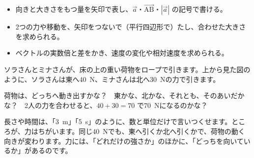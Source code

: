 
\begin{goal}
\begin{itemize}[label={\color{\bkTT}●}, leftmargin=1.6\zw, itemsep=0pt, topsep=1pt]
\item {}\enspace 向きと大きさをもつ量を矢印で表し、$\vec{a}$・$\overrightarrow{\mathrm{AB}}$・$|\vec{a}|$ の記号で書ける。
\item {}\enspace 2つの力や移動を、矢印をつないで（平行四辺形で）たし、合わせた大きさを求められる。
\item {}\enspace ベクトルの実数倍と差をかき、速度の変化や相対速度を求められる。
\end{itemize}
\end{goal}

\begin{hatena}
\noindent\begin{minipage}[c]{0.54\linewidth}\raggedright 
ソラさんとミナさんが、床の上の重い荷物をロープで引きます。上から見た図のように、ソラさんは東へ\qty{40}{N}、ミナさんは北へ\qty{30}{N}の力で引きます。

荷物は、どっちへ動き出すかな？　東かな、北かな、それとも、そのあいだかな？　2人の力を合わせると、$40+30=70$ で\qty{70}{N}になるのかな？
\end{minipage}\hfill
\begin{minipage}[c]{0.43\linewidth}
\centering
{}
\end{minipage}
\end{hatena}

\noindent 長さや時間は、「\qty{3}{m}」「\qty{5}{s}」のように、数と単位だけで言いつくせます。ところが、力はちがいます。同じ\qty{40}{N}でも、東へ引くか北へ引くかで、荷物の動く向きが変わります。力には、「どれだけの強さか」のほかに、「どっちを向いているか」があるのです。

